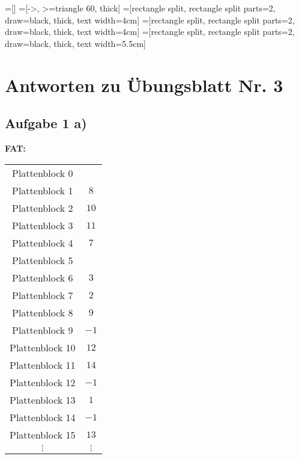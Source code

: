 \documentclass{scrartcl}
\begin{document}
=[]
=[->, >=triangle 60, thick]
=[rectangle split, rectangle split parts=2, draw=black, thick, text width=4cm]
=[rectangle split, rectangle split parts=2, draw=black, thick, text width=4cm]
=[rectangle split, rectangle split parts=2, draw=black, thick, text width=5.5cm]


\section*{Antworten zu Übungsblatt Nr. 3}

\subsection*{Aufgabe 1 a)}
\begin{minipage}[t]{0.4\columnwidth}%
  \vspace{1cm}
  \textbf{FAT:}

  \begin{tabular}{c|c|}
    \cline{2-2}
    Plattenblock  0 &      \\\cline{2-2}
    Plattenblock  1 & $ 8$ \\\cline{2-2}
    Plattenblock  2 & $10$ \\\cline{2-2}
    Plattenblock  3 & $11$ \\\cline{2-2}
    Plattenblock  4 & $ 7$ \\\cline{2-2}
    Plattenblock  5 &      \\\cline{2-2}
    Plattenblock  6 & $ 3$ \\\cline{2-2}
    Plattenblock  7 & $ 2$ \\\cline{2-2}
    Plattenblock  8 & $ 9$ \\\cline{2-2}
    Plattenblock  9 & $-1$ \\\cline{2-2}
    Plattenblock 10 & $12$ \\\cline{2-2}
    Plattenblock 11 & $14$ \\\cline{2-2}
    Plattenblock 12 & $-1$ \\\cline{2-2}
    Plattenblock 13 & $ 1$ \\\cline{2-2}
    Plattenblock 14 & $-1$ \\\cline{2-2}
    Plattenblock 15 & $13$ \\\cline{2-2}
    $\vdots$        & $\vdots$\\
  \end{tabular}%
  \vspace{1cm}
\end{minipage}%
\end{document}
